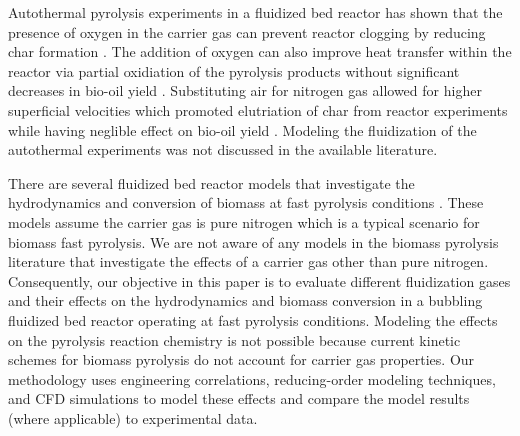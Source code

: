 Autothermal pyrolysis experiments in a fluidized bed reactor has shown that the presence of oxygen in the carrier gas can prevent reactor clogging by reducing char formation \cite{Kim-2014}. The addition of oxygen can also improve heat transfer within the reactor via partial oxidiation of the pyrolysis products without significant decreases in bio-oil yield \cite{Polin-2019a, Oyedeji-2022}. Substituting air for nitrogen gas allowed for higher superficial velocities which promoted elutriation of char from reactor experiments while having neglible effect on bio-oil yield \cite{Polin-2019b}. Modeling the fluidization of the autothermal experiments was not discussed in the available literature.

There are several fluidized bed reactor models that investigate the hydrodynamics and conversion of biomass at fast pyrolysis conditions \cite{Papadikis-2009, Papadikis-2010, Mellin-2014, Xiong-2016, Xue-2011}. These models assume the carrier gas is pure nitrogen which is a typical scenario for biomass fast pyrolysis. We are not aware of any models in the biomass pyrolysis literature that investigate the effects of a carrier gas other than pure nitrogen. Consequently, our objective in this paper is to evaluate different fluidization gases and their effects on the hydrodynamics and biomass conversion in a bubbling fluidized bed reactor operating at fast pyrolysis conditions. Modeling the effects on the pyrolysis reaction chemistry is not possible because current kinetic schemes for biomass pyrolysis do not account for carrier gas properties. Our methodology uses engineering correlations, reducing-order modeling techniques, and CFD simulations to model these effects and compare the model results (where applicable) to experimental data.
